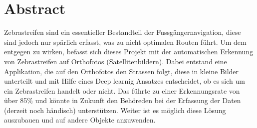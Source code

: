 \chapter*{Abstract}

Zebrastreifen sind ein essentieller Bestandteil der Fussgängernavigation, diese sind jedoch nur spärlich erfasst, was zu nicht optimalen Routen führt. 
Um dem entgegen zu wirken,  befasst sich dieses Projekt mit der automatischen Erkennung von Zebrastreifen auf Orthofotos (Satellitenbildern). 
Dabei entstand eine Applikation, die auf den Orthofotos den Strassen folgt, diese in kleine Bilder unterteilt und mit Hilfe eines Deep learnig Ansatzes entscheidet, ob es sich um ein Zebrastreifen handelt oder nicht.
Das führte zu einer Erkennungsrate von über 85\% und könnte in Zukunft den Behöreden bei der Erfassung der Daten (derzeit noch händisch) unterstützen.
Weiter ist es möglich diese Lösung auszubauen und auf andere Objekte anzuwenden.
